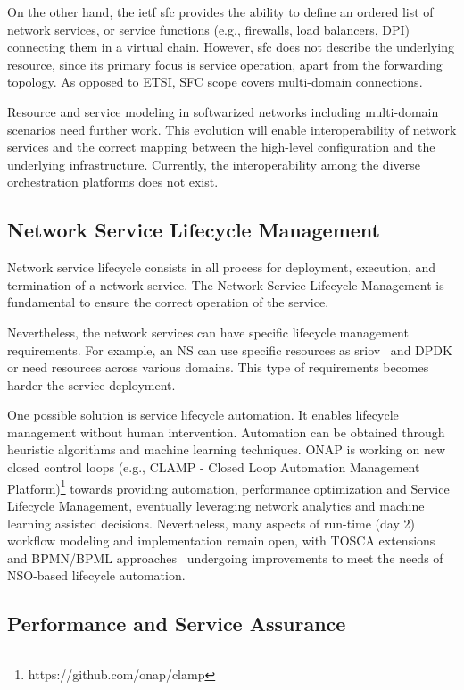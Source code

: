 On the other hand, the \gls{ietf} \gls{sfc} provides the ability to define an ordered list of network services, or service functions (e.g., firewalls, load balancers, DPI) connecting them in a virtual chain. However, \gls{sfc} does not describe the underlying resource, since its primary focus is service operation, apart from the forwarding topology. As opposed to ETSI, SFC scope covers multi-domain connections.   

Resource and service modeling in softwarized networks including multi-domain scenarios need further work. This evolution will enable interoperability of network services and the correct mapping between the high-level configuration and the underlying infrastructure. Currently, the interoperability among the diverse orchestration platforms does not exist.

\subsection{Network Service Lifecycle Management}

Network service lifecycle consists in all process for deployment, execution, and termination of a network service. The Network Service Lifecycle Management is fundamental to ensure the correct operation of the service.

Nevertheless, the network services can have specific lifecycle management requirements. For example, an NS can use specific resources as \gls{sriov}~\cite{5416637} and DPDK or need resources across various domains. This type of requirements becomes harder the service deployment.

One possible solution is service lifecycle automation. It enables lifecycle management without human intervention. Automation can be obtained through heuristic algorithms and machine learning techniques. ONAP is working on new closed control loops (e.g., CLAMP - Closed Loop Automation Management Platform)\footnote{https://github.com/onap/clamp} towards providing automation, performance optimization and Service Lifecycle Management, eventually leveraging network analytics and machine learning assisted decisions.
Nevertheless, many aspects of run-time (day 2) workflow modeling and implementation remain open, with TOSCA extensions and BPMN/BPML approaches~\cite{DBLP:conf/closer/CalcaterraCMT17} undergoing improvements to meet the needs of NSO-based lifecycle automation. 


\subsection{Performance and  Service Assurance}


